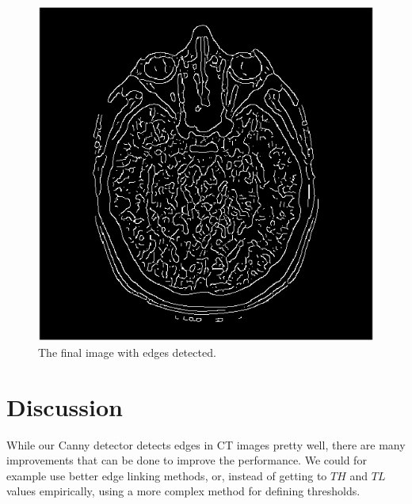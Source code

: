 \documentclass[9pt]{IEEEtran}
\begin{document}
\begin{figure}[!t]
\centering
\includegraphics[width=0.8\columnwidth]{thresholded_image.png}
\caption[c1]{ The final image with edges detected. }
\label{fig_9}
\end{figure}

\section{Discussion}

While our Canny detector detects edges in CT images pretty well, there are many improvements that can be done to improve the performance. We could for example use better edge linking methods, or, instead of getting to $TH$ and $TL$ values empirically, using a more complex method for defining thresholds.

\FloatBarrier



\end{document}
